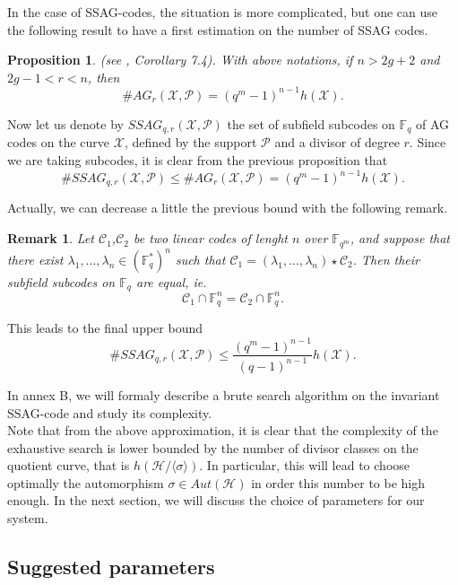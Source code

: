\documentclass[10pt]{article}
\newtheorem{prop1}{Proposition}[]
\newtheorem{rq1}{Remark}[]
\newcommand{\s}{\vspace{0.3cm}}
\newcommand{\C}{\mathcal{C}}
\newcommand{\fqm}{\mathbb{F}_{q^m}}
\newcommand{\fq}{\mathbb{F}_q}
\newcommand{\X}{\mathcal{X}}
\newcommand{\PR}{\mathcal{P}}
\begin{document}
\s

In the case of SSAG-codes, the situation is more complicated, but one can use the following result to have a first estimation on the number of SSAG codes.

\s

\begin{prop1} \rm (see \cite{CMRP}, Corollary 7.4). \it 
With above notations, if $n>2g+2$ and $2g-1<r<n$, then 
\[\#AG_r(\X,\PR) = (q^m-1)^{n-1}h(\X).\]
\end{prop1}

Now let us denote by $SSAG_{q,r}(\X,\PR)$ the set of subfield subcodes on $\fq$ of AG codes on the curve $\X$, defined by the support $\PR$ and a divisor of degree $r$. Since we are taking subcodes, it is clear from the previous proposition that 
\[\#SSAG_{q,r}(\X,\PR) \leq \#AG_r(\X,\PR) = (q^m-1)^{n-1}h(\X).\]

Actually, we can decrease a little the previous bound with the following remark.

\s

\begin{rq1} \rm
Let $\C_1$,$\C_2$ be two linear codes of lenght $n$ over $\fqm$, and suppose that there exist $\lambda_1,...,\lambda_n \in (\fq^*)^n$ such that $\C_1 = (\lambda_1,...,\lambda_n) \star \C_2$. Then their subfield subcodes on $\fq$ are equal, ie.
\[\C_1 \cap \fq^n = \C_2 \cap \fq^n.\]
\end{rq1}

\s

This leads to the final upper bound 
\begin{equation} \label{nb of sssag}
 \#SSAG_{q,r}(\X,\PR) \leq \dfrac{(q^m-1)^{n-1}}{(q-1)^{n-1}}h(\X).
\end{equation} 

\s

In annex B, we will formaly describe a brute search algorithm on the invariant SSAG-code and study its complexity. \\
Note that from the above approximation, it is clear that the complexity of the exhaustive search is lower bounded by the number of divisor classes on the quotient curve, that is $h(\mathcal{H}/\langle \sigma \rangle)$. In particular, this will lead to choose optimally the automorphism $\sigma \in Aut(\mathcal{H})$ in order this number to be high enough. In the next section, we will discuss the choice of parameters for our system.

\s

\subsection{Suggested parameters}
\end{document}
